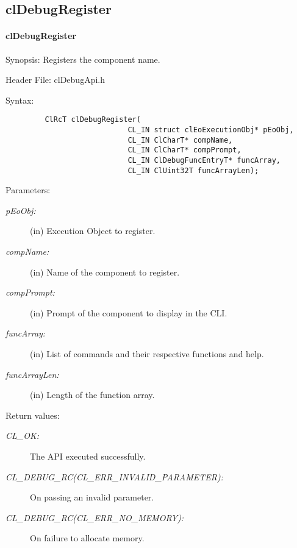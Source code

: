 \subsection{clDebugRegister}
\hypertarget{pagedbg104}{}\paragraph{cl\-Debug\-Register}\label{pagedbg104}
\begin{Desc}
\item[Synopsis:]Registers the component name.\end{Desc}
\begin{Desc}
\item[Header File:]clDebugApi.h\end{Desc}
\begin{Desc}
\item[Syntax:]

\footnotesize\begin{verbatim}         ClRcT clDebugRegister(
                            CL_IN struct clEoExecutionObj* pEoObj,
                            CL_IN ClCharT* compName,
                            CL_IN ClCharT* compPrompt,
                            CL_IN ClDebugFuncEntryT* funcArray,
                            CL_IN ClUint32T funcArrayLen);
\end{verbatim}
\normalsize
\end{Desc}
\begin{Desc}
\item[Parameters:]
\begin{description}
\item[{\em p\-Eo\-Obj:}](in) Execution Object to register. \item[{\em comp\-Name:}](in) Name of the component to register. 
\item[{\em comp\-Prompt:}](in) Prompt of the component to display in the CLI. \item[{\em func\-Array:}](in) List of commands and their respective 
functions and 
help. \item[{\em func\-Array\-Len:}](in) Length of the function array.\end{description}
\end{Desc}
\begin{Desc}
\item[Return values:]
\begin{description}
\item[{\em CL\_\-OK:}]The API executed successfully. \item[{\em CL\_\-DEBUG\_\-RC(CL\_\-ERR\_\-INVALID\_\-PARAMETER):}]On passing an invalid parameter. \item[{\em CL\_\-DEBUG\_\-RC(CL\_\-ERR\_\-NO\_\-MEMORY):}]On failure to allocate memory.\end{description}
\end{Desc}
